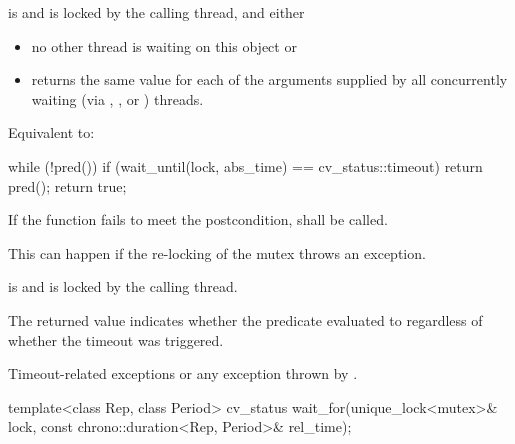 \begin{itemdescr}
\pnum
\requires {} is  and  is
locked by the calling thread, and either

\begin{itemize}
\item no other thread is waiting on this  object or
\item {} returns the same value for each of the 
arguments supplied by all concurrently waiting (via ,
, or ) threads.
\end{itemize}

\pnum
\effects Equivalent to:
\begin{codeblock}
while (!pred())
  if (wait_until(lock, abs_time) == cv_status::timeout)
    return pred();
return true;
\end{codeblock}

\pnum
\remarks
If the function fails to meet the postcondition, 
shall be called.
\begin{note} This can happen if the re-locking of the mutex throws an exception. \end{note}

\pnum
\postconditions {} is  and 
is locked by the calling thread.

\pnum
\begin{note} The returned value indicates whether the predicate evaluated to
 regardless of whether the timeout was triggered. \end{note}

\pnum
\throws Timeout-related
exceptions or any exception thrown by .

\end{itemdescr}


%
\begin{itemdecl}
template<class Rep, class Period>
  cv_status wait_for(unique_lock<mutex>& lock,
                     const chrono::duration<Rep, Period>& rel_time);
\end{itemdecl}

